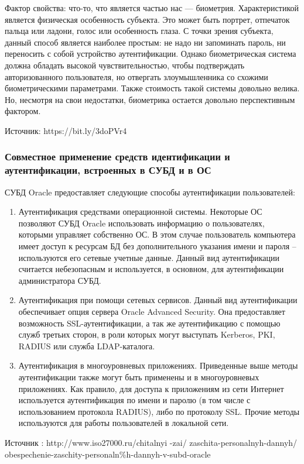 Фактор свойства: что-то, что является частью нас — биометрия. Характеристикой является физическая особенность субъекта. Это может быть портрет, отпечаток пальца или ладони, голос или особенность глаза. С точки зрения субъекта, данный способ является наиболее простым: не надо ни запоминать пароль, ни переносить с собой устройство аутентификации. Однако биометрическая система должна обладать высокой чувствительностью, чтобы подтверждать авторизованного пользователя, но отвергать злоумышленника со схожими биометрическими параметрами. Также стоимость такой системы довольно велика. Но, несмотря на свои недостатки, биометрика остается довольно перспективным фактором.

Источник: https://bit.ly/3doPVr4
\subsubsection{Совместное применение средств идентификации и аутентификации, встроенных в СУБД и в ОС}
СУБД Oracle предоставляет следующие способы аутентификации
пользователей:
\begin{enumerate}
    \item Аутентификация средствами операционной системы. Некоторые ОС
позволяют СУБД Oracle использовать информацию о пользователях, которыми
управляет собственно ОС. В этом случае пользователь компьютера имеет доступ к
ресурсам БД без дополнительного указания имени и пароля – используются его
сетевые учетные данные. Данный вид аутентификации считается небезопасным и
используется, в основном, для аутентификации администратора СУБД.
    \item Аутентификация при помощи сетевых сервисов. Данный вид аутентификации
обеспечивает опция сервера Oracle Advanced Security. Она предоставляет
возможность SSL-аутентификации, а так же аутентификацию с помощью служб
третьих сторон, в роли которых могут выступать Kerberos, PKI, RADIUS или служба
LDAP-каталога.
    \item Аутентификация в многоуровневых приложениях. Приведенные выше
методы аутентификации также могут быть применены и в многоуровневых
приложениях. Как правило, для доступа к приложениям из сети Интернет используется аутентификация по имени и паролю (в том числе с использованием протокола
RADIUS), либо по протоколу SSL. Прочие методы используются для работы
пользователей в локальной сети.
\end{enumerate}

Источник : http://www.iso27000.ru/chitalnyi
-zai/
zaschita-personalnyh-dannyh/
obespechenie-zaschity-personaln\%h-dannyh-v-subd-oracle
